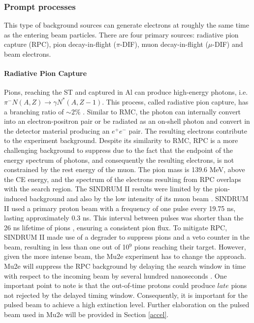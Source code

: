\subsubsection{Prompt processes}
This type of background sources can generate electrons at roughly the same time as 
the entering beam particles. There are four primary sources: radiative pion capture (RPC), 
pion decay-in-flight ($\pi$-DIF), muon decay-in-flight ($\mu$-DIF) and beam electrons.

\paragraph{Radiative Pion Capture}

Pions, reaching the ST and captured in Al can 
produce high-energy photons, i.e. $\pi^- N(A,Z) \rightarrow \gamma N ^* (A,Z-1)$. 
This process, called radiative pion capture,
has a branching ratio of $\sim 2\%$ \cite{PhysRevC.5.1867}.
Similar to RMC, the photon 
can internally convert into an electron-positron pair or be radiated as an on-shell photon 
and convert in the detector material producing an $e^+e^-$ pair. 
The resulting electrons contribute to the experiment background. 
Despite its similarity to RMC, RPC is a more challenging background to suppress due to 
the fact that the endpoint of the energy spectrum of photons, and consequently the 
resulting electrons, is not constrained by the rest energy of the muon.
The pion mass is 139.6 MeV, above the CE energy,
and the spectrum of the electrons resulting from RPC overlaps with the search region. 
The SINDRUM II results 
were limited by the pion-induced background and also by the low intensity of its muon 
beam \cite{SINDRUMII:2006dvw}. SINDRUM II used a primary proton beam with a 
frequency of one pulse every 19.75 ns, lasting approximately 0.3 ns. This interval 
between pulses was shorter than the 26 ns lifetime of pions \cite{zyla}, 
ensuring a consistent pion flux. To mitigate RPC, SINDRUM II made use of a degrader to suppress 
pions and a veto counter in the beam, resulting in less than one out of 10$^9$ pions reaching their 
target. However, given the more intense beam, the Mu2e experiment has to change the approach. 
Mu2e will suppress the RPC background by delaying the search window in time with respect
  to the incoming beam by several hundred nanoseconds \cite{universe9010054}. 
One important point to note is that the out-of-time protons could produce $late$ pions not rejected by the delayed timing window. 
Consequently, it is important for the pulsed beam to achieve a high extinction level. Further elaboration 
on the pulsed beam used in Mu2e will be provided in Section \ref{accel}.
